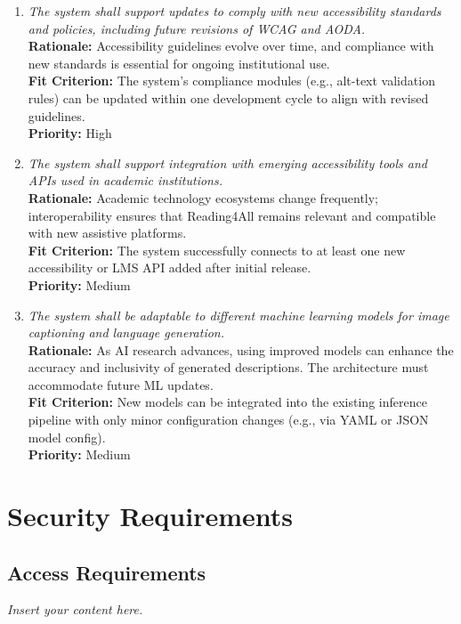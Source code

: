 \documentclass[12pt]{article}
\newcommand{\lips}{\textit{Insert your content here.}}
\begin{document}
\begin{enumerate}[label=MS-AD\arabic*., wide=0pt, leftmargin=*]
  \item \emph{The system shall support updates to comply with new accessibility standards and policies, including future revisions of WCAG and AODA.}\\[2mm]
    {\bf Rationale:} Accessibility guidelines evolve over time, and compliance with new standards is essential for ongoing institutional use.\\
    {\bf Fit Criterion:} The system’s compliance modules (e.g., alt-text validation rules) can be updated within one development cycle to align with revised guidelines.\\
    {\bf Priority:} High

  \item \emph{The system shall support integration with emerging accessibility tools and APIs used in academic institutions.}\\[2mm]
    {\bf Rationale:} Academic technology ecosystems change frequently; interoperability ensures that Reading4All remains relevant and compatible with new assistive platforms.\\
    {\bf Fit Criterion:} The system successfully connects to at least one new accessibility or LMS API added after initial release.\\
    {\bf Priority:} Medium

  \item \emph{The system shall be adaptable to different machine learning models for image captioning and language generation.}\\[2mm]
    {\bf Rationale:} As AI research advances, using improved models can enhance the accuracy and inclusivity of generated descriptions. The architecture must accommodate future ML updates.\\
    {\bf Fit Criterion:} New models can be integrated into the existing inference pipeline with only minor configuration changes (e.g., via YAML or JSON model config).\\
    {\bf Priority:} Medium
\end{enumerate}



\section{Security Requirements}
\subsection{Access Requirements}
\lips
\end{document}
